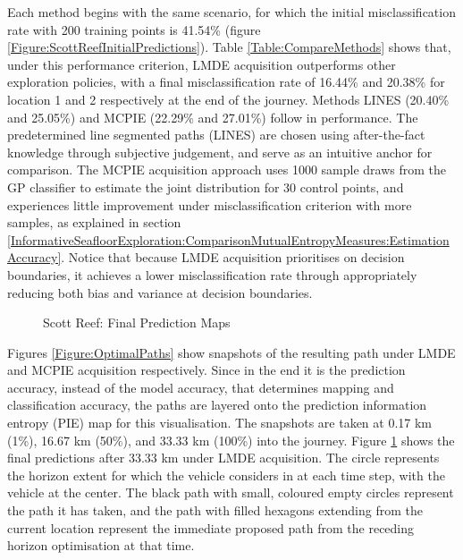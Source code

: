 			Each method begins with the same scenario, for which the initial misclassification rate with 200 training points is 41.54\% (figure \ref{Figure:ScottReefInitialPredictions}). Table \ref{Table:CompareMethods} shows that, under this performance criterion, LMDE acquisition outperforms other exploration policies, with a final misclassification rate of 16.44\% and 20.38\% for location 1 and 2 respectively at the end of the journey. Methods LINES (20.40\% and 25.05\%) and MCPIE (22.29\% and 27.01\%) follow in performance. The predetermined line segmented paths (LINES) are chosen using after-the-fact knowledge through subjective judgement, and serve as an intuitive anchor for comparison. The MCPIE acquisition approach uses 1000 sample draws from the GP classifier to estimate the joint distribution for 30 control points, and experiences little improvement under misclassification criterion with more samples, as explained in section \ref{InformativeSeafloorExploration:ComparisonMutualEntropyMeasures:EstimationAccuracy}. Notice that because LMDE acquisition prioritises on decision boundaries, it achieves a lower misclassification rate through appropriately reducing both bias and variance at decision boundaries.
			
			\begin{figure}[!htbp]
			\centering
			\caption{Scott Reef: Final Prediction Maps}
			\label{Figure:FinalPredictionMap}
			\end{figure}
		
			Figures \ref{Figure:OptimalPaths} show snapshots of the resulting path under LMDE and MCPIE acquisition respectively. Since in the end it is the prediction accuracy, instead of the model accuracy, that determines mapping and classification accuracy, the paths are layered onto the prediction information entropy (PIE) map for this visualisation. The snapshots are taken at 0.17 km (1\%), 16.67 km (50\%), and 33.33 km (100\%) into the journey. Figure \ref{Figure:FinalPredictionMap} shows the final predictions after 33.33 km under LMDE acquisition. The circle represents the horizon extent for which the vehicle considers in at each time step, with the vehicle at the center. The black path with small, coloured empty circles represent the path it has taken, and the path with filled hexagons extending from the current location represent the immediate proposed path from the receding horizon optimisation at that time.
					
